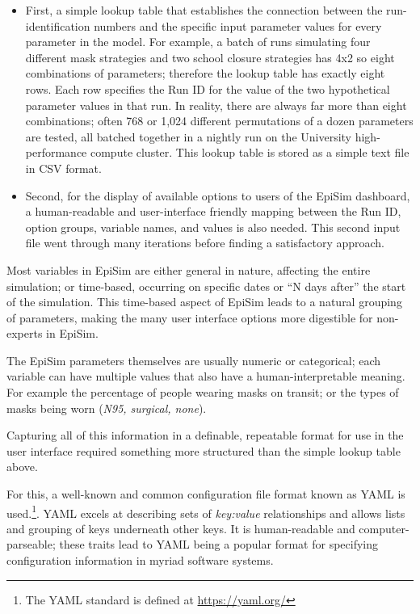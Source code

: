 \begin{itemize}
  \tightlist
  \item
  First, a simple lookup table that establishes the connection between the run-identification numbers and the specific input parameter values for every parameter in the model. For example, a batch of runs simulating four different mask strategies and two school closure strategies has 4x2 so eight combinations of parameters; therefore the lookup table has exactly eight rows. Each row specifies the Run ID for the value of the two hypothetical parameter values in that run. In reality, there are always far more than eight combinations; often 768 or 1,024 different permutations of a dozen parameters are tested, all batched together in a nightly run on the University high-performance compute cluster. This lookup table is stored as a simple text file in CSV format.
  \item
  Second, for the display of available options to users of the EpiSim dashboard, a human-readable and user-interface friendly mapping between the Run ID, option groups, variable names, and values is also needed. This second input file went through many iterations before finding a satisfactory approach.
\end{itemize}

Most variables in EpiSim are either general in nature, affecting the entire simulation; or time-based, occurring on specific dates or ``N days after'' the start of the simulation. This time-based aspect of EpiSim leads to a natural grouping of parameters, making the many user interface options more digestible for non-experts in EpiSim.

The EpiSim parameters themselves are usually numeric or categorical; each variable can have multiple values that also have a human-interpretable meaning. For example the percentage of people wearing masks on transit; or the types of masks being worn (\emph{N95, surgical, none}).

Capturing all of this information in a definable, repeatable format for use in the user interface required something more structured than the simple lookup table above.

For this, a well-known and common configuration file format known as \gls{YAML} is used.\footnote{The YAML standard is defined at \url{https://yaml.org/}}. YAML excels at describing sets of \emph{key:value} relationships and allows lists and grouping of keys underneath other keys. It is human-readable and computer-parseable; these traits lead to YAML being a popular format for specifying configuration information in myriad software systems.

